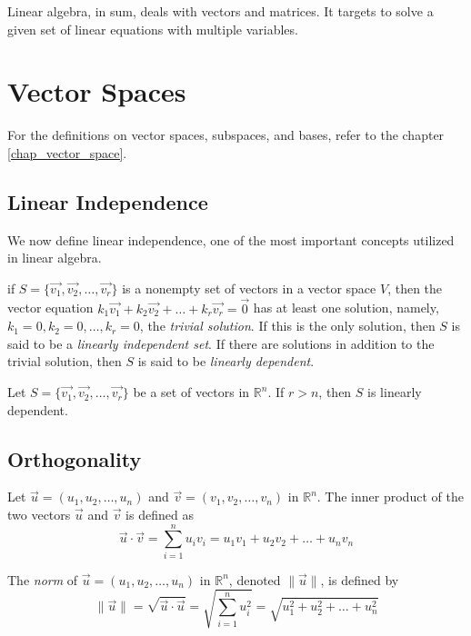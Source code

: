 \documentclass{report}
\begin{document}
Linear algebra, in sum, deals with vectors and matrices. It targets to solve a given set of linear equations with multiple variables.
	\section{Vector Spaces}
		For the definitions on vector spaces, subspaces, and bases, refer to the chapter \ref{chap_vector_space}.
		\subsection{Linear Independence}
		We now define linear independence, one of the most important concepts utilized in linear algebra.
		\begin{defn}
			if $S=\{\vec{v_1}, \vec{v_2}, \dots, \vec{v_r}\}$ is a nonempty set of vectors in a vector space $V$, then the vector equation $k_1\vec{v_1}+k_2\vec{v_2}+\dots+k_r\vec{v_r}=\vec{0}$ has at least one solution, namely, $k_1=0, k_2=0, \dots, k_r=0$, the \emph{trivial solution}. If this is the only solution, then $S$ is said to be a \emph{linearly independent set}. If there are solutions in addition to the trivial solution, then $S$ is said to be \emph{linearly dependent}.
		\end{defn}
		
		\begin{thm}
			Let $S=\{\vec{v_1}, \vec{v_2}, \dots, \vec{v_r}\}$ be a set of vectors in $\mathbb{R}^n$. If $r>n$, then $S$ is linearly dependent.
		\end{thm}
		
		\subsection{Orthogonality}
		\begin{defn}
			Let $\vec{u}=(u_1,u_2,\dots,u_n)$ and $\vec{v}=(v_1,v_2,\dots,v_n)$ in $\mathbb{R}^n$. The inner product of the two vectors $\vec{u}$ and $\vec{v}$ is defined as
			\begin{displaymath}
				\vec{u}\cdot\vec{v}=\sum_{i=1}^{n}u_iv_i=u_1v_1+u_2v_2+\dots+u_nv_n
			\end{displaymath}
		\end{defn}
		
		\begin{defn}[Norm]
			The \emph{norm} of $\vec{u}=(u_1,u_2,\dots,u_n)$ in $\mathbb{R}^n$, denoted $\|\vec{u}\|$, is defined by
			\begin{displaymath}
			\|\vec{u}\|=\sqrt{\vec{u} \cdot \vec{u}}=\sqrt{\sum_{i=1}^{n}u_i^2}=\sqrt{u_1^2+u_2^2+\dots+u_n^2}
			\end{displaymath}
		\end{defn}
		
\end{document}

